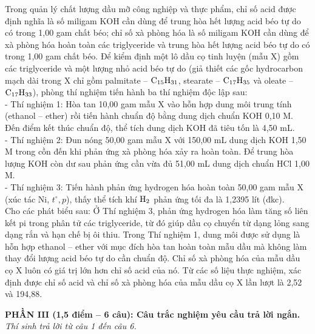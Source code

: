 \documentclass[11pt,a4paper]{article}
\begin{document}
\begin{ex}
Trong quản lý chất lượng dầu mỡ công nghiệp và thực phẩm, chỉ số acid được định nghĩa là số miligam KOH cần dùng để trung hòa hết lượng acid béo tự do có trong 1,00 gam chất béo; chỉ số xà phòng hóa là số miligam KOH cần dùng để xà phòng hóa hoàn toàn các triglyceride và trung hòa hết lượng acid béo tự do có trong 1,00 gam chất béo. Để kiểm định một lô dầu cọ tinh luyện (mẫu X) gồm các triglyceride và một lượng nhỏ acid béo tự do (giả thiết các gốc hydrocarbon mạch dài trong X chỉ gồm palmitate – $\ce{C15H31}$, stearate – $\ce{C17H35}$ và oleate – $\ce{C17H33}$), phòng thí nghiệm tiến hành ba thí nghiệm độc lập sau:\\
- Thí nghiệm 1: Hòa tan 10,00 gam mẫu X vào hỗn hợp dung môi trung tính (ethanol – ether) rồi tiến hành chuẩn độ bằng dung dịch chuẩn KOH 0,10 M. Đến điểm kết thúc chuẩn độ, thể tích dung dịch KOH đã tiêu tốn là 4,50 mL.\\
- Thí nghiệm 2: Đun nóng 50,00 gam mẫu X với 150,00 mL dung dịch KOH 1,50 M trong cồn đến khi phản ứng xà phòng hóa xảy ra hoàn toàn. Để trung hòa lượng KOH còn dư sau phản ứng cần vừa đủ 51,00 mL dung dịch chuẩn HCl 1,00 M.\\
- Thí nghiệm 3: Tiến hành phản ứng hydrogen hóa hoàn toàn 50,00 gam mẫu X (xúc tác Ni, $t^\circ, p$), thấy thể tích khí $\ce{H2}$ phản ứng tối đa là 1,2395 lít (đkc).\\
Cho các phát biểu sau:
\choiceTF
{Ở Thí nghiệm 3, phản ứng hydrogen hóa làm tăng số liên kết pi trong phân tử các triglyceride, từ đó giúp dầu cọ chuyển từ dạng lỏng sang dạng rắn và hạn chế bị ôi thiu.}
{\True Trong Thí nghiệm 1, dung môi được sử dụng là hỗn hợp ethanol – ether với mục đích hòa tan hoàn toàn mẫu dầu mà không làm thay đổi lượng acid béo tự do cần chuẩn độ.}
{\True Chỉ số xà phòng hóa của mẫu dầu cọ X luôn có giá trị lớn hơn chỉ số acid của nó.}
{\True Từ các số liệu thực nghiệm, xác định được chỉ số acid và chỉ số xà phòng hóa của mẫu dầu cọ X lần lượt là 2,52 và 194,88.}

\end{ex}

\vspace{6pt}
\noindent
\textbf{\color{mainGreen}PHẦN III (1,5 điểm -- 6 câu): Câu trắc nghiệm yêu cầu trả lời ngắn.}\\
\textit{Thí sinh trả lời từ câu 1 đến câu 6.}

\setcounter{ex}{0}
\end{document}
